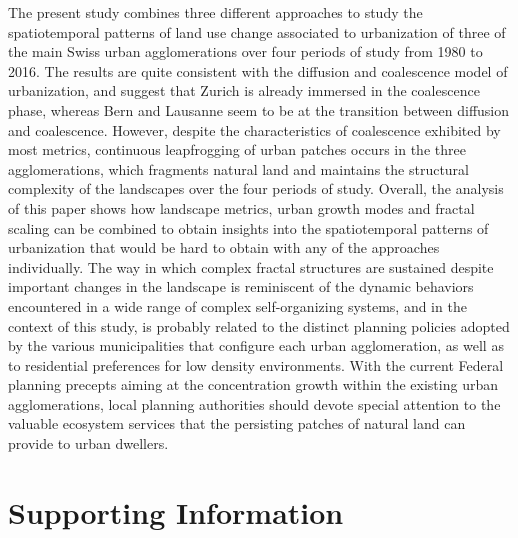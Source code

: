 \documentclass[10pt,letterpaper]{article}
\begin{document}
The present study combines three different approaches to study the spatiotemporal patterns of land use change associated to urbanization of three of the main Swiss urban agglomerations over four periods of study from 1980 to 2016.
The results are quite consistent with the diffusion and coalescence model of urbanization, and suggest that Zurich is already immersed in the coalescence phase, whereas Bern and Lausanne seem to be at the transition between diffusion and coalescence.
However, despite the characteristics of coalescence exhibited by most metrics, continuous leapfrogging of urban patches occurs in the three agglomerations, which fragments natural land and maintains the structural complexity of the landscapes over the four periods of study.
Overall, the analysis of this paper shows how landscape metrics, urban growth modes and fractal scaling can be combined to obtain insights into the spatiotemporal patterns of urbanization that would be hard to obtain with any of the approaches individually. %
The way in which complex fractal structures are sustained despite important changes in the landscape is reminiscent of the dynamic behaviors encountered in a wide range of complex self-organizing systems, and in the context of this study, is probably related to the distinct planning policies adopted by the various municipalities that configure each urban agglomeration, as well as to residential preferences for low density environments.
With the current Federal planning precepts aiming at the concentration growth within the existing urban agglomerations, local planning authorities should devote special attention to the valuable ecosystem services that the persisting patches of natural land can provide to urban dwellers.



\section*{Supporting Information}
\end{document}

